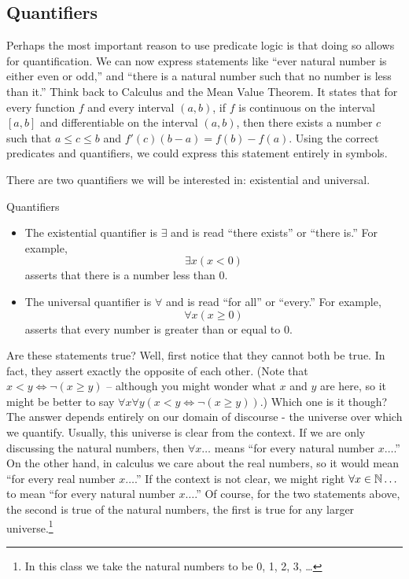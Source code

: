 \documentclass[12pt]{article}
\begin{document}
\subsection{Quantifiers}

Perhaps the most important reason to use predicate logic is that doing so allows for quantification.  We can now express statements like ``ever natural number is either even or odd,'' and ``there is a natural number such that no number is less than it.''  Think back to Calculus and the Mean Value Theorem.  It states that for every function $f$ and every interval $(a, b)$, if $f$ is continuous on the interval $[a,b]$ and differentiable on the interval $(a,b)$, then there exists a number $c$ such that $a \le c \le b$ and $f'(c)(b - a) = f(b) - f(a)$.  Using the correct predicates and quantifiers, we could express this statement entirely in symbols.  

There are two quantifiers we will be interested in: existential and universal.  

\begin{defbox}{Quantifiers}
  \begin{itemize}
    \item The existential quantifier is $\exists$ and is read ``there exists'' or ``there is.''  For example,
\[\exists x (x < 0)\]
asserts that there is a number less than 0.
\item The universal quantifier is $\forall$ and is read ``for all'' or ``every.''  For example,
\[\forall x (x \ge 0)\]
asserts that every number is greater than or equal to 0.
  \end{itemize}    
\end{defbox}

  Are these statements true?  Well, first notice that they cannot both be true.  In fact, they assert exactly the opposite of each other.  (Note that $x < y \iff \neg(x \ge y)$ -- although you might wonder what $x$ and $y$ are here, so it might be better to say $\forall x \forall y\left(x < y \iff \neg(x \ge y)\right)$.)  Which one is it though?  The answer depends entirely on our domain of discourse - the universe over which we quantify.  Usually, this universe is clear from the context.  If we are only discussing the natural numbers, then $\forall x \ldots$ means ``for every natural number $x \ldots$.''  On the other hand, in calculus we care about the real numbers, so it would mean ``for every real number $x \ldots$.''  If the context is not clear, we might right $\forall x \in \mathbb N\ldots$ to mean ``for every natural number $x\ldots$.''  Of course, for the two statements above, the second is true of the natural numbers, the first is true for any larger universe.\footnote{In this class we take the natural 
numbers to be 0, 1, 2, 3, \ldots}
\end{document}

